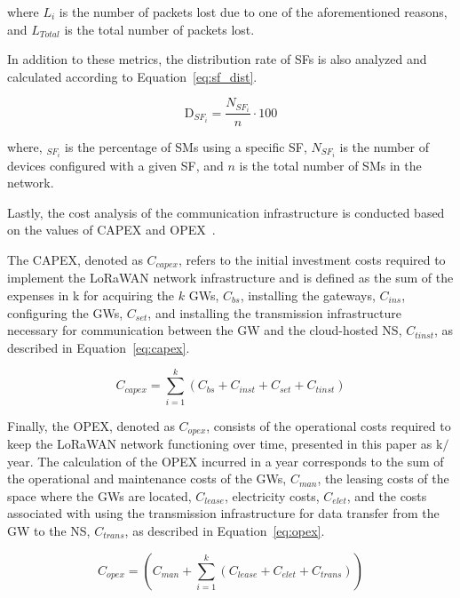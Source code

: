 \documentclass[a4paper,fleqn]{cas-dc}
\begin{document}
\noindent where \( L_{i} \) is the number of packets lost due to one of the aforementioned reasons, and \( L_{Total} \) is the total number of packets lost.

In addition to these metrics, the distribution rate of SFs is also analyzed and calculated according to Equation~\ref{eq:sf_dist}.

\begin{equation} \label{eq:sf_dist}
    \text{D}_{SF_{i}} = \frac {{N_{SF_{i}}}} {n} \cdot 100
\end{equation}

\noindent where, $_{SF_{i}}$ is the percentage of \gls{SMs} using a specific \gls{SF}, $N_{SF_{i}}$ is the number of devices configured with a given \gls{SF}, and $n$ is the total number of \gls{SMs} in the network.

Lastly, the cost analysis of the communication infrastructure is conducted based on the values of \gls{CAPEX} and \gls{OPEX}~\cite{matni2020lorawan, neriPerformance2022}.

The \gls{CAPEX}, denoted as \( C_{capex} \), refers to the initial investment costs required to implement the \gls{LoRaWAN} network infrastructure and is defined as the sum of the expenses in k\EUR{} for acquiring the \( k \) \gls{GWs}, \( C_{bs} \), installing the gateways, \( C_{ins} \), configuring the \gls{GWs}, \( C_{set} \), and installing the transmission infrastructure necessary for communication between the GW and the cloud-hosted \gls{NS}, \( C_{tinst} \), as described in Equation~\ref{eq:capex}.

\begin{equation} \label{eq:capex}
    C_{capex} = \sum \limits_{i=1}^{k} \left( C_{bs} + C_{inst} + C_{set} + C_{tinst} \right)
\end{equation}

Finally, the \gls{OPEX}, denoted as \( C_{opex} \), consists of the operational costs required to keep the \gls{LoRaWAN} network functioning over time, presented in this paper as k\EUR{}$/$year. The calculation of the \gls{OPEX} incurred in a year corresponds to the sum of the operational and maintenance costs of the \gls{GWs}, \( C_{man} \), the leasing costs of the space where the \gls{GWs} are located, \( C_{lease} \), electricity costs, \( C_{elet} \), and the costs associated with using the transmission infrastructure for data transfer from the GW to the \gls{NS}, \( C_{trans} \), as described in Equation~\ref{eq:opex}.

\begin{equation} \label{eq:opex}
    C_{opex} = \left( C_{man} + \sum \limits_{i=1}^{k} \left( C_{lease} + C_{elet} + C_{trans} \right) \right)
\end{equation}
\end{document}

